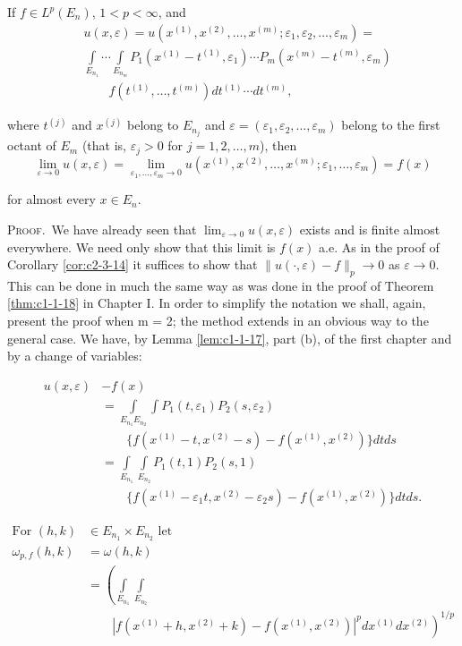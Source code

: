 \begin{theorem}
\label{thm:c2-3-22}
If $f \in L^p(E_n)$, $1 < p < \infty$, and
\[
\begin{aligned}&u(x,\varepsilon)=u(x^{(1)},x^{(2)},\ldots,x^{(m)};\varepsilon_{1},\varepsilon_{2},\ldots,\varepsilon_{m})=\\ &\int\limits_{E_{n_{1}}}\cdots\int\limits_{E_{n_{m}}}P_{1}(x^{(1)}-t^{(1)},\varepsilon_{1})\cdots P_{m}(x^{(m)}-t^{(m)},\varepsilon_{m})\\&\qquad f(t^{(1)},\ldots,t^{(m)})dt^{(1)}\cdots dt^{(m)},\end{aligned}
\]

where $t^{(j)}$ and $x^{(j)}$ belong to $E_{n_j}$ and $\varepsilon = (\varepsilon_1, \varepsilon_2, \ldots, \varepsilon_m)$ belong to the first octant of $E_m$ (that is, $\varepsilon_j > 0$ for $j = 1,2, \ldots, m$), then
\[
\lim_{\varepsilon\to0}u(x,\varepsilon)=\lim_{\varepsilon_{1},\ldots,\varepsilon_{m}\to0}u(x^{(1)},x^{(2)},\ldots,x^{(m)};\varepsilon_{1},\ldots,\varepsilon_{m})=f(x)
\]

for almost every $x \in E_n$.
\end{theorem}

\textsc{Proof.}\ We have already seen that $\lim_{\varepsilon \to 0} u(x, \varepsilon)$ exists and is finite almost everywhere. We need only show that this limit is $f(x)$ a.e. As in the proof of Corollary \ref{cor:c2-3-14} it suffices to show that $\|u(\cdot, \varepsilon) - f\|_{p} \to 0$ as $\varepsilon \to 0$. This can be done in much the same way as was done in the proof of Theorem \ref{thm:c1-1-18} in Chapter I. In order to simplify the notation we shall, again, present the proof when m = 2; the method extends in an obvious way to the general case. We have, by Lemma \ref{lem:c1-1-17}, part (b), of the first chapter and by a change of variables:

\[
\begin{aligned}u(x,\varepsilon)&-f(x)\\&=\int\limits_{E_{n_{1}}E_{n_{2}}}\int P_{1}(t,\varepsilon_{1})P_{2}(s,\varepsilon_{2})\\&\qquad\{f(x^{(1)}-t,x^{(2)}-s)-f(x^{(1)},x^{(2)})\}dt ds\\&=\int\limits_{E_{n_{1}}}\int\limits_{E_{n_{2}}}P_{1}(t,1)P_{2}(s,1)\\&\qquad\{f(x^{(1)}-\varepsilon_{1}t,x^{(2)}-\varepsilon_{2}s)-f(x^{(1)},x^{(2)})\}dt ds.\end{aligned}
\]

\[
\begin{aligned}\text{For }(h,k)&\in E_{n_{1}}\times E_{n_{2}}\text{ let}\\\omega_{p,f}(h,k)&=\omega(h,k)\\&=\left(\int\limits_{E_{n_{1}}}\int\limits_{E_{n_{2}}}\right.\\&\qquad\left.|f(x^{(1)}+h,x^{(2)}+k)-f(x^{(1)},x^{(2)})|^{p} dx^{(1)}dx^{(2)}\right)^{1/p}\end{aligned}
\]

